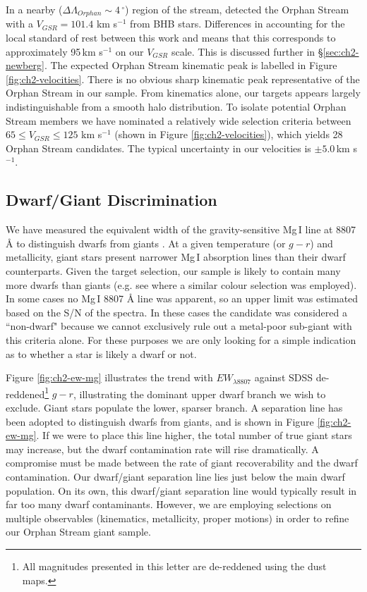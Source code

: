 In a nearby ($\Delta\Lambda_{Orphan} \sim 4\,^\circ$) region of the stream, \citet{Newberg_et-al_2010} detected the Orphan Stream with a $V_{GSR} = 101.4$ km s$^{-1}$ from BHB stars. Differences in accounting for the local standard of rest between this work and \citet{Newberg_et-al_2010} means that this corresponds to approximately 95\,km s$^{-1}$ on our $V_{GSR}$ scale.  This is discussed further in \S\ref{sec:ch2-newberg}. The expected Orphan Stream kinematic peak is labelled in Figure \ref{fig:ch2-velocities}. There is no obvious sharp kinematic peak representative of the Orphan Stream in our sample. From kinematics alone, our targets appears largely indistinguishable from a smooth halo distribution. To isolate potential Orphan Stream members we have nominated a relatively wide selection criteria between $65 \leq V_{GSR} \leq 125$ km s$^{-1}$ (shown in Figure \ref{fig:ch2-velocities}), which yields 28 Orphan Stream candidates. The typical uncertainty in our velocities is $\pm{}5.0$\,km s$^{-1}$.

\subsection{Dwarf/Giant Discrimination}
\label{sec:ch2-dwarf-giant}

We have measured the equivalent width of the gravity-sensitive Mg\,\textsc{I} line at 8807 \AA{} to distinguish dwarfs from giants \citep{Battaglia_Starkenburg_2012}. At a given temperature (or $g - r$) and metallicity, giant stars present narrower Mg\,\textsc{I} absorption lines than their dwarf counterparts. Given the target selection, our sample is likely to contain many more dwarfs than giants (e.g. see \citet{Casey_et-al_2012} where a similar colour selection was employed). In some cases no Mg\,\textsc{I} 8807 \AA{} line was apparent, so an upper limit was estimated based on the S/N of the spectra. In these cases the candidate was considered a ``non-dwarf" because we cannot exclusively rule out a metal-poor sub-giant with this criteria alone. For these purposes we are only looking for a simple indication as to whether a star is likely a dwarf or not. 

Figure \ref{fig:ch2-ew-mg} illustrates the trend with $EW_{\lambda8807}$ against SDSS de-reddened\footnote{All magnitudes presented in this letter are de-reddened using the \citet{Schlegel_Finkbeiner_Davis_1998} dust maps.} $g - r$, illustrating the dominant upper dwarf branch we wish to exclude. Giant stars populate the lower, sparser branch. A separation line has been adopted to distinguish dwarfs from giants, and is shown in Figure \ref{fig:ch2-ew-mg}. If we were to place this line higher, the total number of true giant stars may increase, but the dwarf contamination rate will rise dramatically. A compromise must be made between the rate of giant recoverability and the dwarf contamination. Our  dwarf/giant separation line lies just below the main dwarf population. On its own, this dwarf/giant separation line would typically result in far too many dwarf contaminants. However, we are  employing selections on multiple observables (kinematics, metallicity, proper motions) in order to refine our Orphan Stream giant sample. 

